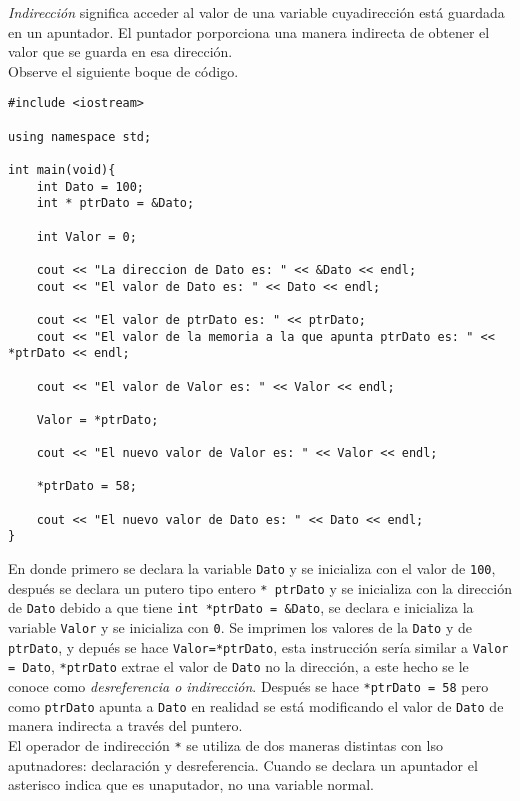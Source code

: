 \documentclass[12pt]{extarticle}
\newcommand{\<}{\langle}
\renewcommand{\>}{\rangle}
\theoremstyle{definition}
\begin{document}
\textit{Indirección} significa acceder al valor de una variable cuyadirección está guardada en un apuntador. El puntador porporciona una manera indirecta de obtener el valor que se guarda en esa dirección.\\

Observe el siguiente boque de código.

\begin{lstlisting}
#include <iostream>

using namespace std;

int main(void){
	int Dato = 100;
	int * ptrDato = &Dato;
	
	int Valor = 0;
	
	cout << "La direccion de Dato es: " << &Dato << endl;
	cout << "El valor de Dato es: " << Dato << endl; 
	
	cout << "El valor de ptrDato es: " << ptrDato;
	cout << "El valor de la memoria a la que apunta ptrDato es: " << *ptrDato << endl;
	
	cout << "El valor de Valor es: " << Valor << endl; 
	
	Valor = *ptrDato;
	
	cout << "El nuevo valor de Valor es: " << Valor << endl; 
	
	*ptrDato = 58;
	
	cout << "El nuevo valor de Dato es: " << Dato << endl; 
}
\end{lstlisting}

En donde primero se declara la variable \verb|Dato| y se inicializa con el valor de \verb|100|, después se declara un putero tipo entero \verb|* ptrDato| y se inicializa con la dirección de \verb|Dato| debido a que tiene \verb|int *ptrDato = &Dato|, se declara e inicializa la variable \verb|Valor| y se inicializa con \verb|0|. Se imprimen los valores de la \verb|Dato| y de \verb|ptrDato|, y depués se hace \verb|Valor=*ptrDato|, esta instrucción sería similar a \verb|Valor = Dato|, \verb|*ptrDato| extrae el valor de \verb|Dato| no la dirección, a este hecho se le conoce como \textit{desreferencia o indirección}. Después se hace \verb|*ptrDato = 58| pero como \verb|ptrDato| apunta a \verb|Dato| en realidad se está modificando el valor de \verb|Dato| de manera indirecta a través del puntero. \\

El operador de indirección \verb|*| se utiliza de dos maneras distintas con lso aputnadores: declaración y desreferencia. Cuando se declara un apuntador el asterisco indica que es unaputador, no una variable normal.\\
\end{document}
